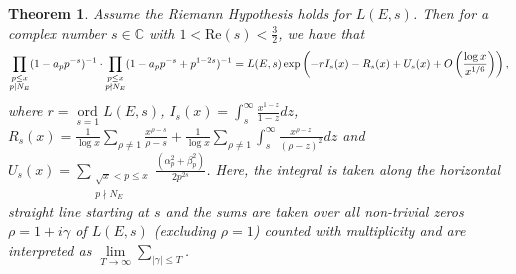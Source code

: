 \documentclass[12pt,reqno]{amsart}
\newtheorem{theorem}{Theorem}[section]
\theoremstyle{definition}
\numberwithin{equation}{section}
\newcommand{\ord}{\mathop{\mathrm{ord}}}
\renewcommand{\Re}{\mathrm{Re}}
\begin{document}
\begin{theorem} \label{mainthm} 
Assume the Riemann Hypothesis holds for $L(E, s)$. Then for a complex number $s \in \mathbb C$ with $1< \Re(s)< \frac{3}{2}$,  we have that 
\begin{equation*}
\prod_ {\substack{p \leq x \\ p | N_E}}(1-a_pp^{-s})^{-1} \cdot  \prod_ {\substack{p \leq x \\ p \nmid N_E}} (1-a_pp^{-s}+p^{1-2s})^{-1}  = L(E, s)  \exp \left (-r I_s(x) - R_s(x) 
+  U_s(x)+ O \left ( \frac{\log x}{x^{1/6}} \right ) \right),  \\
\end{equation*}
where $r=\ord \limits _{s=1} L(E, s)$,  $\displaystyle I_s(x)= \int_{s}^{\infty} \frac{x^{1-z}}{1-z} dz$,  $
\displaystyle R_s(x) = \frac{1}{\log x} \sum \limits_{ \rho \neq 1 } \frac{x^{\rho-s}}{ \rho-s}+ \frac{1}{ \log x} \sum \limits_{\rho \neq 1} \int_{s}^{\infty} \frac{x^{\rho-z}}{(\rho-z)^2}dz$ and  $ \displaystyle U_s(x)= \sum_{\substack{\sqrt x < p \leq x \\ p \nmid  N_E}} \frac{(\alpha_p^2+\beta_p^2) }{2p^{2s}} $. Here, the integral is taken along the horizontal straight line starting at $s$ and the sums are taken over all non-trivial zeros $\rho=1+i \gamma$ of $L(E, s)$ (excluding $\rho=1$) counted with multiplicity and are interpreted as $\lim \limits _{T \to \infty} \sum \limits _{ |\gamma| \leq T}$. 
\end{theorem}
\end{document}
